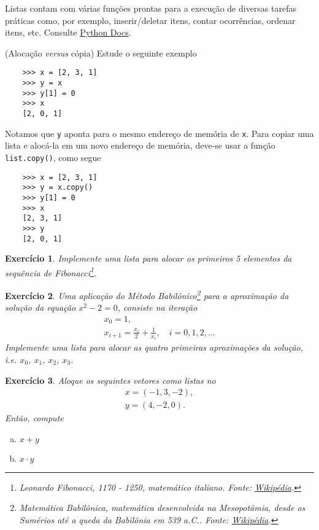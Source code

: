 \documentclass[12pt]{article}
\newtheorem{exr}{Exercício}[section]
\begin{document}
\begin{obs}
  Listas contam com várias funções prontas para a execução de diversas tarefas práticas como, por exemplo, inserir/deletar itens, contar ocorrências, ordenar itens, etc. Consulte \href{https://docs.python.org/3/tutorial/datastructures.html#more-on-lists}{Python Docs}.
\end{obs}

\begin{obs}(Alocação {\it versus} cópia)
  Estude o seguinte exemplo
  \begin{lstlisting}
    >>> x = [2, 3, 1]
    >>> y = x
    >>> y[1] = 0
    >>> x
    [2, 0, 1]
  \end{lstlisting}
  Notamos que \lstinline+y+ aponta para o mesmo endereço de memória de \lstinline+x+. Para copiar uma lista e alocá-la em um novo endereço de memória, deve-se usar a função \lstinline+list.copy()+, como segue
  \begin{lstlisting}
    >>> x = [2, 3, 1]
    >>> y = x.copy()
    >>> y[1] = 0
    >>> x
    [2, 3, 1]
    >>> y
    [2, 0, 1]
  \end{lstlisting}
\end{obs}

\begin{exr}
  Implemente uma lista para alocar os primeiros 5 elementos da sequência de Fibonacci\footnote{Leonardo Fibonacci, 1170 - 1250, matemático italiano. Fonte: \href{https://pt.wikipedia.org/wiki/Leonardo\_Fibonacci}{Wikipédia}.}.
\end{exr}

\begin{exr}
  Uma aplicação do Método Babilônico\footnote{Matemática Babilônica, matemática desenvolvida na Mesopotâmia, desde os Sumérios até a queda da Babilônia em 539 a.C.. Fonte: \href{https://pt.wikipedia.org/wiki/Matem\%C3\%A1tica\_babil\%C3\%B4nica}{Wikipédia}.} para a aproximação da solução da equação $x^2-2 = 0$, consiste na iteração
  \begin{gather}
    x_0 = 1,\\
    x_{i+1} = \frac{x_i}{2} + \frac{1}{x_i},\quad i=0,1,2,\ldots
  \end{gather}
  Implemente uma lista para alocar as quatro primeiras aproximações da solução, i.e. $x_0$, $x_1$, $x_2$, $x_3$.
\end{exr}

\begin{exr}
  Aloque os seguintes vetores como listas no {\python}
  \begin{gather}
    x = (-1, 3, -2),\\
    y = (4, -2, 0).
  \end{gather}
  Então, compute
  \begin{enumerate}[a)]
  \item $x+y$
  \item $x\cdot y$
  \end{enumerate}
\end{exr}
\end{document}
